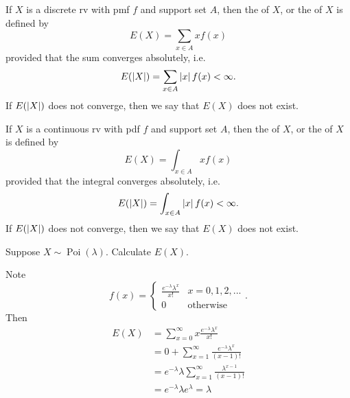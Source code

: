 \documentclass[notoc,notitlepage]{tufte-book}
\DeclareMathOperator{\Poi}{Poi }
\begin{document}
\begin{defn}
\label{defn:expectation_of_a_discrete_rv}
  If $X$ is a discrete rv with pmf $f$ and support set $A$, then the  of $X$, or the  of $X$ is defined by
  \begin{equation}\label{eq:expectation_discrete}
    E(X) = \sum_{x \in A} x f(x)
  \end{equation}
  provided that the sum converges absolutely, i.e.
  \begin{equation*}
    E(\left|X\right|) = \sum_{x \in A} \left|x\right| f(x) < \infty.
  \end{equation*}
  If $E(\left|X\right|)$ does not converge, then we say that $E(X)$ does not exist.
\end{defn}

\begin{defn}
\label{defn:expectation_of_a_continuous_rv}
  If $X$ is a continuous rv with pdf $f$ and support set $A$, then the  of $X$, or the  of $X$ is defined by
  \begin{equation}\label{eq:expectation_continuous}
    E(X) = \int_{x \in A} x f(x)
  \end{equation}
  provided that the integral converges absolutely, i.e.
  \begin{equation*}
    E(\left|X\right|) = \int_{x \in A} \left|x\right| f(x) < \infty.
  \end{equation*}
  If $E(\left|X\right|)$ does not converge, then we say that $E(X)$ does not exist.
\end{defn}

\begin{eg}[Example 2.16]
  Suppose $X \sim \Poi(\lambda)$. Calculate $E(X)$.

  \begin{solution}
    Note
    \begin{equation*}
      f(x) = \begin{cases}
        \frac{e^{- \lambda} \lambda^x}{x!}  & x = 0, 1, 2, ... \\
        0                                   & \text{otherwise}
      \end{cases}.
    \end{equation*}
    Then
    \begin{align*}
      E(X) &= \sum_{x = 0}^{\infty} x \frac{e^{-\lambda} \lambda^x}{x!} \\
           &= 0 + \sum_{x = 1}^{\infty} \frac{e^{-\lambda} \lambda^x}{(x - 1)!} \\
           &= e^{-\lambda} \lambda \sum_{x = 1}^{\infty} \frac{\lambda^{x - 1}}{(x - 1)!} \\
           &= e^{-\lambda} \lambda e^{\lambda} = \lambda
    \end{align*}
  \end{solution}
\end{eg}
\end{document}
